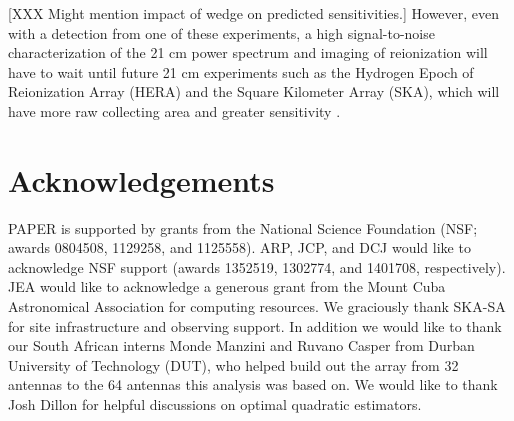 \documentclass[twocolumn,numberedappendix]{emulateapj} \shorttitle{PSA64}
\begin{document}
[XXX Might mention impact of wedge on predicted sensitivities.]
However, even with a detection from one of these experiments, a high signal-to-noise characterization of the 21 cm power spectrum and imaging of reionization will have to
wait until future 21 cm experiments such as the Hydrogen Epoch of Reionization
Array (HERA) and the Square Kilometer Array (SKA), which will have more raw
collecting area and greater sensitivity \citep{pober_et_al2014}.

\section{Acknowledgements} 

PAPER is supported by grants from the National Science Foundation (NSF; awards 0804508,
1129258, and 1125558).  ARP, JCP, and DCJ would like to acknowledge NSF support
(awards 1352519, 1302774, and 1401708, respectively).
JEA would like to acknowledge a generous grant from the Mount Cuba Astronomical Association for
computing resources.
We graciously thank SKA-SA for site infrastructure and observing support. In
addition we would like to thank our South African interns Monde Manzini and
Ruvano Casper from Durban University of Technology (DUT), who helped build out
the array from 32 antennas to the 64 antennas this analysis was based on. 
We would like to thank Josh Dillon for helpful discussions on optimal quadratic
estimators. 



\end{document}
